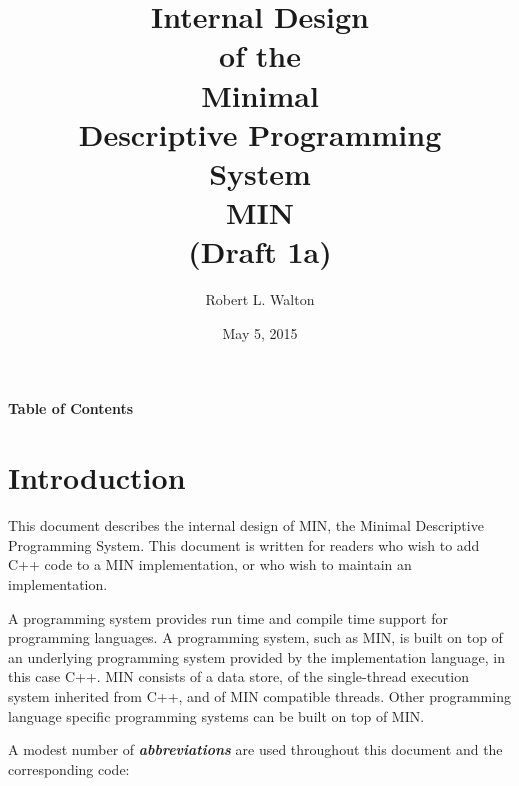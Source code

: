 \documentclass[12pt]{article}
\makeatletter
\renewcommand\tableofcontents{%
    \begin{list}{}%
	     {\setlength{\itemsep}{0in}%
	      \setlength{\topsep}{0in}%
	      \setlength{\parsep}{1ex}%
	      \setlength{\labelwidth}{0in}%
	      \setlength{\baselineskip}{1.5ex}%
	      \setlength{\leftmargin}{0.8in}%
	      \setlength{\rightmargin}{0.8in}}%
    \item\@starttoc{toc}%
    \end{list}}
\newcommand{\skey}[2]{{\bf \em #1#2}\index{#1}}
\makeatother
\begin{document}
        
\title{Internal Design\\[2ex]of the\\[2ex]
       Minimal\\Descriptive Programming\\System\\[2ex]MIN\\[2ex]
       (Draft 1a)}

\author{Robert L. Walton}

\date{May 5, 2015}
 
\maketitle

\newpage
\begin{center}
\large \bf Table of Contents
\end{center}

\bigskip

\tableofcontents 

\newpage

\section{Introduction}

This document describes the internal design of MIN,
the Minimal Descriptive Programming System.
This document is written for readers who wish to add C++ code
to a MIN implementation, or who wish to maintain an implementation.

A programming system provides run time and compile time support
for programming languages.
A programming system, such as MIN, is
built on top of an underlying programming system provided by the
implementation language, in this case C++.
MIN consists of a data store, of the single-thread execution system
inherited from C++, and of MIN compatible threads.
Other programming language specific
programming systems can be built on top of MIN.

A modest number of \skey{abbreviation}s are used throughout this document
and the corresponding code:
\end{document}
